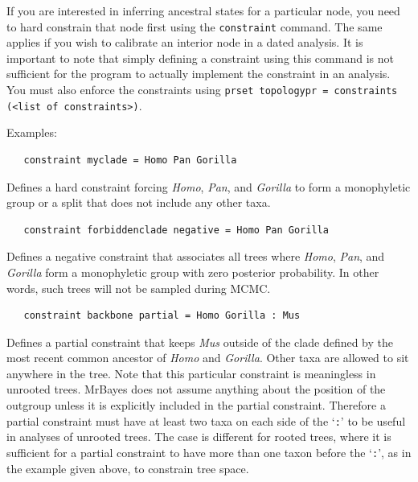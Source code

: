 \documentclass[12pt]{book}
\newcommand{\ttt}[1]{\texttt{#1}}
\begin{document}
If you are interested in inferring ancestral states for a particular node, you need to hard
constrain that node first using the \ttt{constraint} command. The same applies if you wish to
calibrate an interior node in a dated analysis. It is important to note that simply defining a
constraint using this command is not sufficient for the program to actually implement the
constraint in an analysis. You must also enforce the constraints using \ttt{prset topologypr =
constraints (<list of constraints>)}.

Examples:

\begin{singlespacing}
\small
\begin{verbatim}
   constraint myclade = Homo Pan Gorilla
\end{verbatim}
\normalsize
\end{singlespacing}

Defines a hard constraint forcing \textit{Homo}, \textit{Pan}, and \textit{Gorilla} to form a
monophyletic group or a split that does not include any other taxa.

\begin{singlespacing}
\small
\begin{verbatim}
   constraint forbiddenclade negative = Homo Pan Gorilla
\end{verbatim}
\normalsize
\end{singlespacing}

Defines a negative constraint that associates all trees where \textit{Homo}, \textit{Pan}, and
\textit{Gorilla} form a monophyletic group with zero posterior probability. In other words, such
trees will not be sampled during MCMC.

\begin{singlespacing}
\small
\begin{verbatim}
   constraint backbone partial = Homo Gorilla : Mus
\end{verbatim}
\normalsize
\end{singlespacing}

Defines a partial constraint that keeps \textit{Mus} outside of the clade defined by the most
recent common ancestor of \textit{Homo} and \textit{Gorilla}. Other taxa are allowed to sit
anywhere in the tree. Note that this particular constraint is meaningless in unrooted trees.
MrBayes does not assume anything about the position of the outgroup unless it is explicitly
included in the partial constraint. Therefore a partial constraint must have at least two taxa on
each side of the `\ttt{:}' to be useful in analyses of unrooted trees. The case is different for
rooted trees, where it is sufficient for a partial constraint to have more than one taxon before
the `\ttt{:}', as in the example given above, to constrain tree space.
\end{document}
